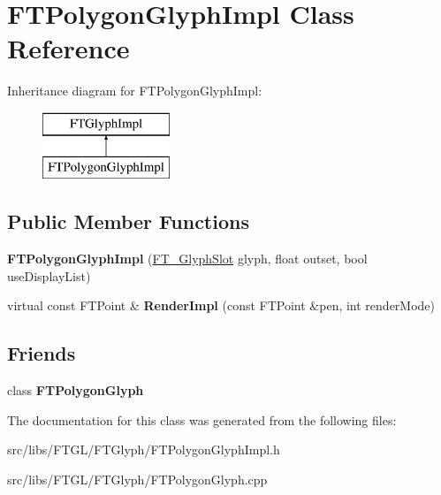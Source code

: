 \hypertarget{class_f_t_polygon_glyph_impl}{
\section{FTPolygonGlyphImpl Class Reference}
\label{class_f_t_polygon_glyph_impl}
}
Inheritance diagram for FTPolygonGlyphImpl:\begin{figure}[H]
\begin{center}
\leavevmode
\includegraphics[height=2.000000cm]{class_f_t_polygon_glyph_impl}
\end{center}
\end{figure}
\subsection*{Public Member Functions}
\begin{DoxyCompactItemize}
\item 
\hypertarget{class_f_t_polygon_glyph_impl_ab302277a0e76adf9570f1ef9f9ae851f}{
{\bfseries FTPolygonGlyphImpl} (\hyperlink{struct_f_t___glyph_slot_rec__}{FT\_\-GlyphSlot} glyph, float outset, bool useDisplayList)}
\label{class_f_t_polygon_glyph_impl_ab302277a0e76adf9570f1ef9f9ae851f}

\item 
\hypertarget{class_f_t_polygon_glyph_impl_af689ff9cecc738d292d494bf83adca39}{
virtual const FTPoint \& {\bfseries RenderImpl} (const FTPoint \&pen, int renderMode)}
\label{class_f_t_polygon_glyph_impl_af689ff9cecc738d292d494bf83adca39}

\end{DoxyCompactItemize}
\subsection*{Friends}
\begin{DoxyCompactItemize}
\item 
\hypertarget{class_f_t_polygon_glyph_impl_a0e33f7bc34e1097f8f9adcb6252d1bc0}{
class {\bfseries FTPolygonGlyph}}
\label{class_f_t_polygon_glyph_impl_a0e33f7bc34e1097f8f9adcb6252d1bc0}

\end{DoxyCompactItemize}


The documentation for this class was generated from the following files:\begin{DoxyCompactItemize}
\item 
src/libs/FTGL/FTGlyph/FTPolygonGlyphImpl.h\item 
src/libs/FTGL/FTGlyph/FTPolygonGlyph.cpp\end{DoxyCompactItemize}
